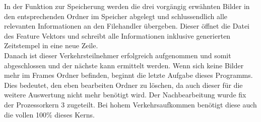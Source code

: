 In der Funktion zur Speicherung werden die drei vorgängig erwähnten Bilder in den entsprechenden Ordner im Speicher abgelegt und schlussendlich alle relevanten Informationen an den Filehandler übergeben. Dieser öffnet die Datei des Feature Vektors und schreibt alle Informationen inklusive generierten Zeitstempel in eine neue Zeile.\\
Danach ist dieser Verkehrsteilnehmer erfolgreich aufgenommen und somit abgeschlossen und der nächste kann ermittelt werden.
Wenn sich keine Bilder mehr im Frames Ordner befinden, beginnt die letzte Aufgabe dieses Programms. Dies bedeutet, den eben bearbeiten Ordner zu löschen, da auch dieser für die weitere Auswertung nicht mehr benötigt wird. Der Nachbearbeitung wurde fix der Prozessorkern 3 zugeteilt. Bei hohem Verkehrsaufkommen benötigt diese auch die vollen 100\% dieses Kerns. \cite{OpenCVCC}

